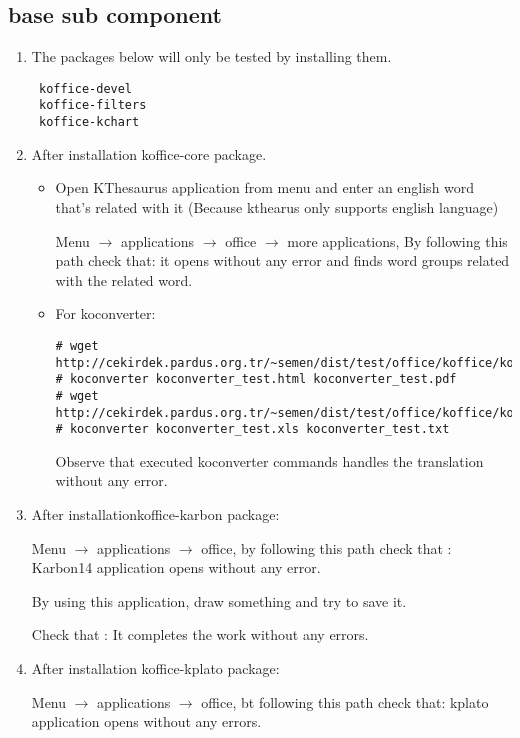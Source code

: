 \documentclass[a4paper,10pt]{article}
\begin{document}
\subsection*{base sub component}
\begin{enumerate}
\item The packages below will only be tested by installing them.

\begin{verbatim}
 koffice-devel 
 koffice-filters
 koffice-kchart
\end{verbatim}
\item After installation koffice-core package.

\begin{itemize}
\item Open KThesaurus application from menu and enter an english word that's related with it (Because kthearus only supports english language)

Menu $\rightarrow$ applications $\rightarrow$ office $\rightarrow$ more applications, By following this path check that: it opens without any error and finds word groups related with the related word.

\item For koconverter:
\begin{verbatim}
# wget http://cekirdek.pardus.org.tr/~semen/dist/test/office/koffice/koconverter_test.html
# koconverter koconverter_test.html koconverter_test.pdf
# wget http://cekirdek.pardus.org.tr/~semen/dist/test/office/koffice/koconverter_test.xls
# koconverter koconverter_test.xls koconverter_test.txt
\end{verbatim}

Observe that executed koconverter commands handles the translation without any error.
\end{itemize}
\item After installationkoffice-karbon package:

Menu $\rightarrow$ applications $\rightarrow$ office, by following this path check that :  Karbon14 application opens without any error.

By using this application, draw  something and try to save it.

Check that : It completes the work without any errors.

\item After installation koffice-kplato package:

Menu $\rightarrow$ applications $\rightarrow$ office, bt following this path check that: kplato application opens without any errors.


\end{enumerate}
\end{document}
